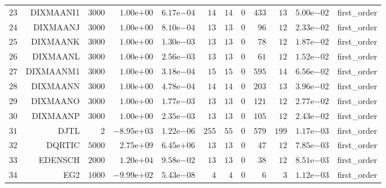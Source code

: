\begin{longtable}{rrrrrrrrrrrr}
  \(    23\) & DIXMAANI1 & \(  3000\) & \( 1.00\)e\(+00\) & \( 6.17\)e\(-04\) & \(    14\) & \(    14\) & \(     0\) & \(   433\) & \(    13\) & \( 5.00\)e\(-02\) & first\_order \\
  \(    24\) & DIXMAANJ & \(  3000\) & \( 1.00\)e\(+00\) & \( 8.10\)e\(-04\) & \(    13\) & \(    13\) & \(     0\) & \(    96\) & \(    12\) & \( 2.33\)e\(-02\) & first\_order \\
  \(    25\) & DIXMAANK & \(  3000\) & \( 1.00\)e\(+00\) & \( 1.30\)e\(-03\) & \(    13\) & \(    13\) & \(     0\) & \(    78\) & \(    12\) & \( 1.87\)e\(-02\) & first\_order \\
  \(    26\) & DIXMAANL & \(  3000\) & \( 1.00\)e\(+00\) & \( 2.56\)e\(-03\) & \(    13\) & \(    13\) & \(     0\) & \(    61\) & \(    12\) & \( 1.52\)e\(-02\) & first\_order \\
  \(    27\) & DIXMAANM1 & \(  3000\) & \( 1.00\)e\(+00\) & \( 3.18\)e\(-04\) & \(    15\) & \(    15\) & \(     0\) & \(   595\) & \(    14\) & \( 6.56\)e\(-02\) & first\_order \\
  \(    28\) & DIXMAANN & \(  3000\) & \( 1.00\)e\(+00\) & \( 4.78\)e\(-04\) & \(    14\) & \(    14\) & \(     0\) & \(   203\) & \(    13\) & \( 3.96\)e\(-02\) & first\_order \\
  \(    29\) & DIXMAANO & \(  3000\) & \( 1.00\)e\(+00\) & \( 1.77\)e\(-03\) & \(    13\) & \(    13\) & \(     0\) & \(   121\) & \(    12\) & \( 2.77\)e\(-02\) & first\_order \\
  \(    30\) & DIXMAANP & \(  3000\) & \( 1.00\)e\(+00\) & \( 2.35\)e\(-03\) & \(    13\) & \(    13\) & \(     0\) & \(   105\) & \(    12\) & \( 2.43\)e\(-02\) & first\_order \\
  \(    31\) & DJTL & \(     2\) & \(-8.95\)e\(+03\) & \( 1.22\)e\(-06\) & \(   255\) & \(    55\) & \(     0\) & \(   579\) & \(   199\) & \( 1.17\)e\(-03\) & first\_order \\
  \(    32\) & DQRTIC & \(  5000\) & \( 2.75\)e\(+09\) & \( 6.45\)e\(+06\) & \(    13\) & \(    13\) & \(     0\) & \(    47\) & \(    12\) & \( 7.85\)e\(-03\) & first\_order \\
  \(    33\) & EDENSCH & \(  2000\) & \( 1.20\)e\(+04\) & \( 9.58\)e\(-02\) & \(    13\) & \(    13\) & \(     0\) & \(    38\) & \(    12\) & \( 8.51\)e\(-03\) & first\_order \\
  \(    34\) & EG2 & \(  1000\) & \(-9.99\)e\(+02\) & \( 5.43\)e\(-08\) & \(     4\) & \(     4\) & \(     0\) & \(     6\) & \(     3\) & \( 1.12\)e\(-03\) & first\_order \\

\end{longtable}
